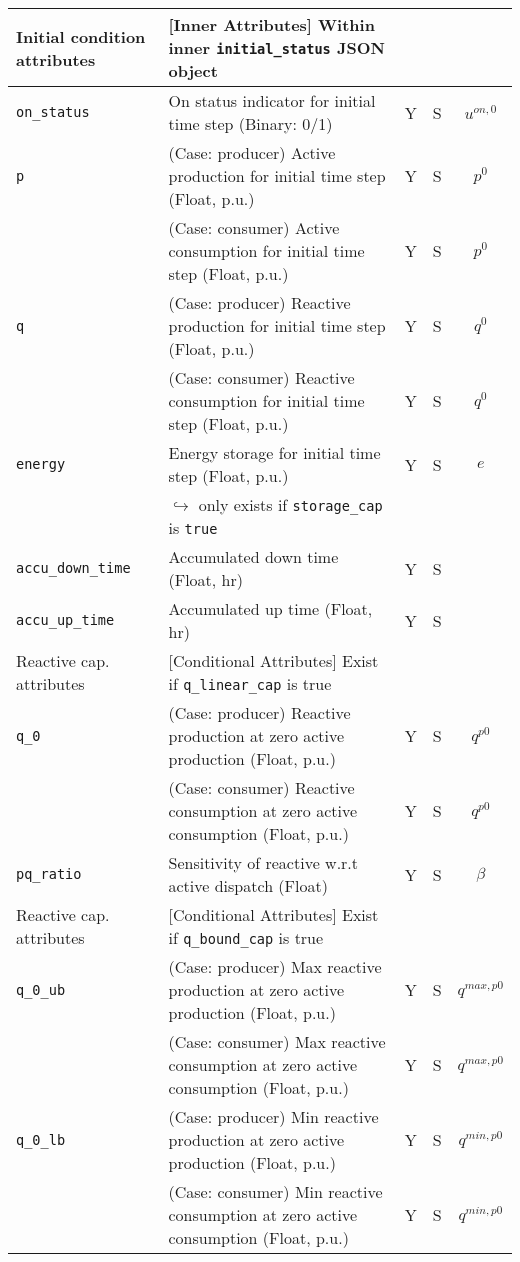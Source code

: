 \documentclass{article}
\begin{document}
\begin{center}
\small
\begin{tabular}{ l | l | c | c | c |}
  Initial condition attributes &  [Inner Attributes] Within inner {\tt initial\_status} JSON object &  &  & \\
  \hline    
  {\tt on\_status} & On status indicator for initial time step (Binary: 0/1) & Y & S & $u^{on,0}$\\
  {\tt p} & {\color{red} (Case: producer) Active production for initial time step (Float, p.u.) }& Y & S & $p^0$ \\
          & {\color{red} (Case: consumer) Active consumption for initial time step (Float, p.u.) }& Y & S & $p^0$ \\
  {\tt q} & {\color{red} (Case: producer) Reactive production for initial time step (Float, p.u.) }& Y & S & $q^0$ \\
          & {\color{red} (Case: consumer) Reactive consumption for initial time step (Float, p.u.) }& Y & S & $q^0$ \\
  {\tt energy} & Energy storage for initial time step (Float, p.u.)& Y & S & $e$\\  
                          & $\hookrightarrow$ only exists if \texttt{storage\_cap} is \texttt{true} & & & \\  
  {\tt accu\_down\_time} & Accumulated down time (Float, hr) & Y & S & \\  
  {\tt accu\_up\_time} & Accumulated up time (Float, hr) & Y & S & \\  
 \hline
 \hline
  Reactive cap. attributes & [Conditional Attributes] Exist if {\tt q\_linear\_cap} is true &  &  & \\
  \hline
  {\tt q\_0}               & {\color{red} (Case: producer) Reactive production at zero active production (Float, p.u.) }& Y & S & $q^{p0}$\\
                           & {\color{red} (Case: consumer) Reactive consumption at zero active consumption (Float, p.u.) }& Y & S & $q^{p0}$\\
  {\tt pq\_ratio}          & Sensitivity of reactive w.r.t active dispatch (Float) & Y & S & $\beta$\\
  \hline
  Reactive cap. attributes & [Conditional Attributes] Exist if {\tt q\_bound\_cap} is true &  &  & \\
  \hline
  {\tt q\_0\_ub}           & {\color{red} (Case: producer) Max reactive production at zero active production (Float, p.u.)} & Y & S & $q^{max,p0}$\\
                           & {\color{red} (Case: consumer) Max reactive consumption at zero active consumption (Float, p.u.)} & Y & S & $q^{max,p0}$\\
  {\tt q\_0\_lb}           & {\color{red} (Case: producer) Min reactive production at zero active production (Float, p.u.)} & Y & S & $q^{min,p0}$\\
                           & {\color{red} (Case: consumer) Min reactive consumption at zero active consumption (Float, p.u.)} & Y & S & $q^{min,p0}$\\
  

\end{tabular}
\end{center}
\end{document}
